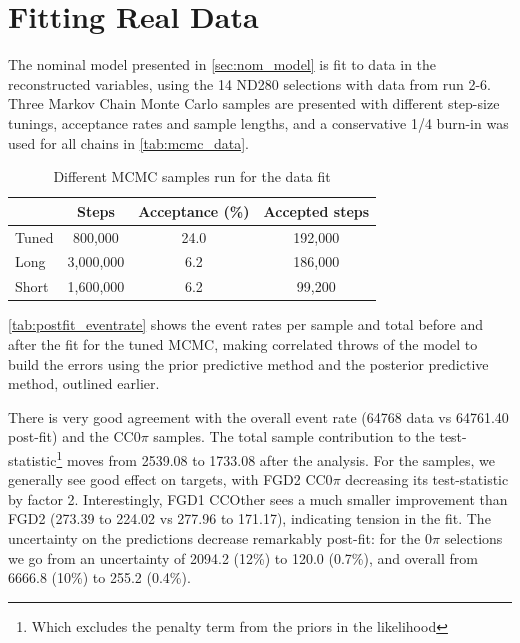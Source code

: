 \section{Fitting Real Data}
\label{sec:datafit}
The nominal model presented in \autoref{sec:nom_model} is fit to data in the reconstructed \pmu \cosmu variables, using the 14 ND280 selections with data from run 2-6. Three Markov Chain Monte Carlo samples are presented with different step-size tunings, acceptance rates and sample lengths, and a conservative 1/4 burn-in was used for all chains in \autoref{tab:mcmc_data}.
\begin{table}[h]
	\centering
	\begin{tabular}{l | c c c}
		\hline \hline
					& Steps		& Acceptance (\%) & Accepted steps \\
		\hline
		Tuned			& 800,000		& 24.0 	& 192,000 \\
		Long			& 3,000,000		& 6.2 	& 186,000 \\
		Short			& 1,600,000		& 6.2 	& 99,200 \\
		\hline \hline
	\end{tabular}
\caption{Different MCMC samples run for the data fit}
\label{tab:mcmc_data}
\end{table}

\autoref{tab:postfit_eventrate} shows the event rates per sample and total before and after the fit for the tuned MCMC, making correlated throws of the model to build the errors using the prior predictive method and the posterior predictive method, outlined earlier. 

There is very good agreement with the overall event rate (64768 data vs 64761.40 post-fit) and the CC0$\pi$ samples. The total sample contribution to the test-statistic\footnote{Which excludes the penalty term from the priors in the likelihood} moves from 2539.08 to 1733.08 after the analysis. For the samples, we generally see good effect on targets, with FGD2 CC0$\pi$ decreasing its test-statistic by factor 2. Interestingly, FGD1 CCOther sees a much smaller improvement than FGD2 (273.39 to 224.02 vs 277.96 to 171.17), indicating tension in the fit. The uncertainty on the predictions decrease remarkably post-fit: for the 0$\pi$ selections we go from an uncertainty of 2094.2 (12\%) to 120.0 (0.7\%), and overall from 6666.8 (10\%) to 255.2 (0.4\%). 

